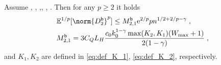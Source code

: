 \begin{lemma}
\label{lem:bound_p_moment_for_H_component}
Assume , , ,, ,  .  Then for any $p\geq 2$ it holds
\begin{align}
    &\PE^{1/p}[\norm{D_2^{\boot}}^p]\leq M_{2,1}^{\boot}\rme^{2/p}p n^{1/2+2/p-\gamma}\eqsp,\\
    & M_{2,1}^{\boot}= 3C_QL_H\frac{c_0k_0^{1-\gamma}\max(K_2,K_1)(W_{\max}+1)}{2(1-\gamma)}\eqsp,
\end{align}
and $K_1, K_2$ are defined in \eqref{eq:def_K_1}, \eqref{eq:def_K_2}, respectively.
\end{lemma}
